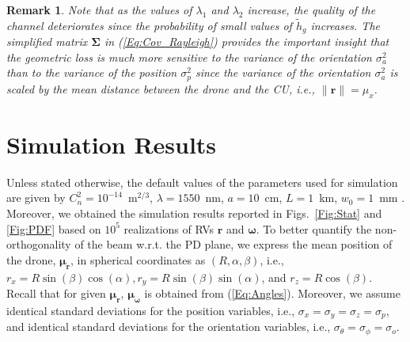 \documentclass[conference]{IEEEtran}
\newtheorem{remk}{Remark}
\begin{document}
\begin{remk}\label{Remk:Special}
Note that as the values of $\lambda_1$ and $\lambda_2$ increase, the quality of the channel deteriorates since the probability of small values of  $\tilde{h}_g$ increases. 
The simplified matrix $\boldsymbol{\Sigma}$ in (\ref{Eq:Cov_Rayleigh}) provides the important insight that the geometric loss is much more sensitive to the variance of the orientation $\sigma^2_{a}$ than to the variance of the position $\sigma^2_{p}$ since the variance of the orientation $\sigma^2_{a}$ is scaled by the mean distance between the drone and the CU, i.e., $\|\mathbf{r}\|=\mu_x$. 
\end{remk}

\section{Simulation Results}\label{Sec:Sim}
Unless stated otherwise, the default values of the parameters used for simulation are given by $C_n^2=10^{-14}$~m$^{2/3}$, $\lambda=1550$~nm, $a=10$~cm, $L=1$~km, $w_0=1$~mm \cite{Steve_pointing_error,Alouini_Pointing}. Moreover, we obtained the simulation results reported in Figs.~\ref{Fig:Stat} and \ref{Fig:PDF} based on $10^5$ realizations of RVs $\mathbf{r}$ and $\boldsymbol{\omega}$.
To better quantify the non-orthogonality of the beam w.r.t. the PD plane, we express the mean position of the drone, $\boldsymbol{\mu}_{\mathbf{r}}$, in spherical coordinates as $(R,\alpha,\beta)$, i.e., $r_x=R\sin(\beta)\cos(\alpha), r_y=R\sin(\beta)\sin(\alpha)$, and $r_z  = R\cos(\beta)$. Recall that for given $\boldsymbol{\mu}_{\mathbf{r}}$, $\boldsymbol{\mu}_{\boldsymbol{\omega}}$ is obtained from (\ref{Eq:Angles}). Moreover, we assume identical standard deviations for the position variables, i.e., $\sigma_x=\sigma_y=\sigma_z= \sigma_p$, and identical standard deviations for the orientation variables, i.e., $\sigma_{\theta}=\sigma_{\phi}= \sigma_o$. 
\end{document}

